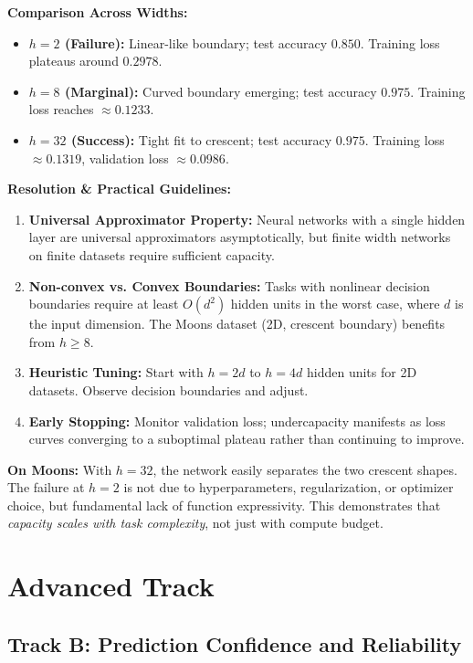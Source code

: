 \documentclass[sigconf,screen,nonacm]{acmart}
\begin{document}
\noindent\textbf{Comparison Across Widths:}
\begin{itemize}
    \item \textbf{$h=2$ (Failure):} Linear-like boundary; test accuracy $0.850$. Training loss plateaus around $0.2978$.
    \item \textbf{$h=8$ (Marginal):} Curved boundary emerging; test accuracy $0.975$. Training loss reaches $\approx 0.1233$.
    \item \textbf{$h=32$ (Success):} Tight fit to crescent; test accuracy $0.975$. Training loss $\approx 0.1319$, validation loss $\approx 0.0986$.
\end{itemize}

\noindent\textbf{Resolution \& Practical Guidelines:}
\begin{enumerate}
    \item \textbf{Universal Approximator Property:} Neural networks with a single hidden layer are universal approximators asymptotically, but finite width networks on finite datasets require sufficient capacity.
    \item \textbf{Non-convex vs. Convex Boundaries:} Tasks with nonlinear decision boundaries require at least $O(d^2)$ hidden units in the worst case, where $d$ is the input dimension. The Moons dataset (2D, crescent boundary) benefits from $h \geq 8$.
    \item \textbf{Heuristic Tuning:} Start with $h = 2d$ to $h = 4d$ hidden units for 2D datasets. Observe decision boundaries and adjust.
    \item \textbf{Early Stopping:} Monitor validation loss; undercapacity manifests as loss curves converging to a suboptimal plateau rather than continuing to improve.
\end{enumerate}

\noindent\textbf{On Moons:} With $h=32$, the network easily separates the two crescent shapes. The failure at $h=2$ is not due to hyperparameters, regularization, or optimizer choice, but fundamental lack of function expressivity. This demonstrates that \emph{capacity scales with task complexity}, not just with compute budget.
\section{Advanced Track}

\subsection{Track B: Prediction Confidence and Reliability}
\end{document}
